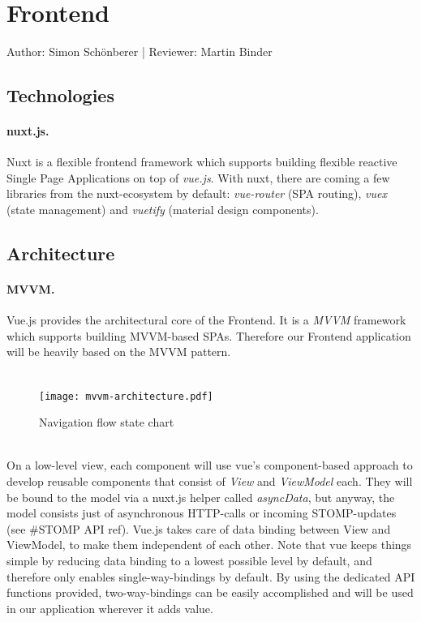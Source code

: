 \documentclass{scrreprt}
\begin{document}
\section{Frontend}
Author: Simon Sch\"onberer | Reviewer: Martin Binder
\subsection{Technologies}
\paragraph{nuxt.js.} Nuxt is a flexible frontend framework which supports building flexible
reactive Single Page Applications on top of \emph{vue.js}. With nuxt, there are coming a few
libraries from the nuxt-ecosystem by default: \emph{vue-router} (SPA routing), \emph{vuex}
(state management) and \emph{vuetify} (material design components).

\subsection{Architecture}
\paragraph{MVVM.} Vue.js provides the architectural core of the Frontend. It is a \emph{MVVM}
framework which supports building MVVM-based SPAs. Therefore our Frontend application will be
heavily based on the MVVM pattern.
\\ \\ 
\begin{figure}[h]
	\centering
	\texttt{[image: mvvm-architecture.pdf]}
	\caption{Navigation flow state chart}
	\label{MVVM}
\end{figure}
\\

On a low-level view, each component will use vue's component-based approach to develop
reusable components that consist of \emph{View} and \emph{ViewModel} each. They will be bound
to the model via a nuxt.js helper called \emph{asyncData}, but anyway, the model consists 
just of asynchronous HTTP-calls or incoming STOMP-updates (see \#STOMP API ref). Vue.js takes
care of data binding between View and ViewModel, to make them independent of each other.
Note that vue keeps things simple by reducing data binding to a lowest possible level by
default, and therefore only enables single-way-bindings by default. By using the dedicated
API functions provided, two-way-bindings can be easily accomplished and will be used in our
application wherever it adds value.
\end{document}
